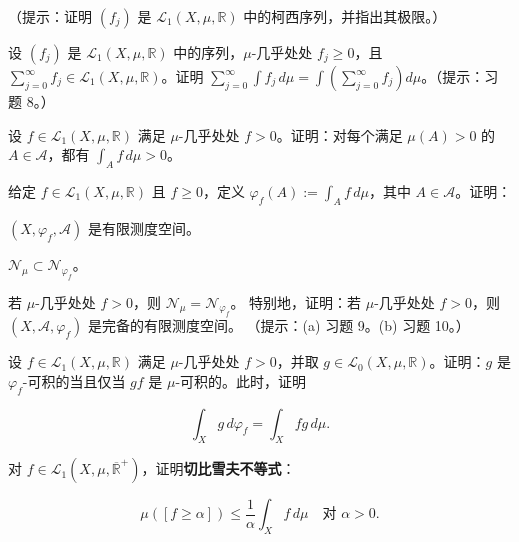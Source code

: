 \begin{exercises}
（提示：证明 $ (f_j) $ 是 $ \mathcal{L}_1(X,\mu,\mathbb{R}) $ 中的柯西序列，并指出其极限。）

\item

设 $ (f_j) $ 是 $ \mathcal{L}_1(X,\mu,\mathbb{R}) $ 中的序列，$ \mu $-几乎处处 $ f_j \ge 0 $，且 $ \sum_{j=0}^{\infty} f_j \in \mathcal{L}_1(X,\mu,\mathbb{R}) $。证明 $ \sum_{j=0}^{\infty} \int f_j \, d\mu = \int \left( \sum_{j=0}^{\infty} f_j \right) d\mu $。（提示：习题 8。）

\item

设 $ f \in \mathcal{L}_1(X,\mu,\mathbb{R}) $ 满足 $ \mu $-几乎处处 $ f > 0 $。证明：对每个满足 $ \mu(A) > 0 $ 的 $ A \in \mathcal{A} $，都有 $ \int_A f \, d\mu > 0 $。

\item

给定 $ f \in \mathcal{L}_1(X,\mu,\mathbb{R}) $ 且 $ f \ge 0 $，定义 $ \varphi_f(A) := \int_A f \, d\mu $，其中 $ A \in \mathcal{A} $。证明：

\begin{items}
\item

$ (X,\varphi_f,\mathcal{A}) $ 是有限测度空间。

\item

$ \mathcal{N}_\mu \subset \mathcal{N}_{\varphi_f} $。

\item

若 $ \mu $-几乎处处 $ f > 0 $，则 $ \mathcal{N}_\mu = \mathcal{N}_{\varphi_f} $。
特别地，证明：若 $ \mu $-几乎处处 $ f > 0 $，则 $ (X,\mathcal{A},\varphi_f) $ 是完备的有限测度空间。
（提示：(a) 习题 9。(b) 习题 10。）

\end{items}

\item

设 $ f \in \mathcal{L}_1(X,\mu,\mathbb{R}) $ 满足 $ \mu $-几乎处处 $ f > 0 $，并取 $ g \in \mathcal{L}_0(X,\mu,\mathbb{R}) $。证明：$ g $ 是 $ \varphi_f $-可积的当且仅当 $ gf $ 是 $ \mu $-可积的。此时，证明

\[
\int_X g \, d\varphi_f = \int_X fg \, d\mu .
\]
\item

对 $ f \in \mathcal{L}_1(X,\mu,\overline{\mathbb{R}}^+) $，证明\textbf{切比雪夫不等式}：

\[
\mu\left( [f \ge \alpha] \right) \le \frac{1}{\alpha} \int_X f \, d\mu \quad \text{对 } \alpha > 0 .
\]
\item


\end{exercises}
